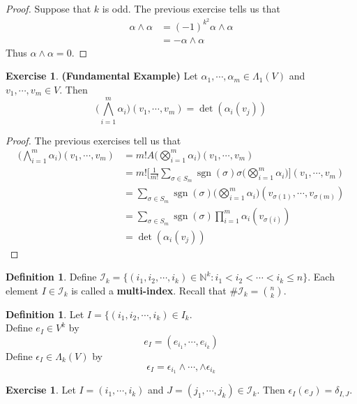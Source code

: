 \documentclass[12pt]{amsart}
\theoremstyle{definition}
\newtheorem{defn}[definition]{Definition}
\theoremstyle{remark}
\theoremstyle{definition}
\newtheorem{ex}[definition]{Exercise}
\newcommand{\al}{\alpha}
\newcommand{\del}{\delta}
\newcommand{\Lam}{\Lambda}
\newcommand{\ep}{\epsilon}
\newcommand{\sig}{\sigma}
\newcommand{\N}{\mathbb{N}}
\newcommand{\MI}{\mathcal{I}}
\DeclareMathOperator{\sgn}{sgn}
\begin{document}
	\begin{proof}
		Suppose that $k$ is odd. The previous exercise tells us that 
		\begin{align*}
			\al \wedge \al 
			&= (-1)^{k^2} \al \wedge \al \\
			&= -\al \wedge \al
		\end{align*}
		Thus $\al \wedge \al = 0$.
	\end{proof}
	
	\begin{ex}\textbf{(Fundamental Example)}
		Let $\al_1, \cdots, \al_m \in \Lam_1(V)$ and $v_1, \cdots, v_m \in V$. Then $$\bigg( \bigwedge_{i=1}^m \al_i \bigg)(v_1, \cdots, v_m) = \det (\al_i (v_j))$$
	\end{ex}

	\begin{proof}
		The previous exercises tell us that
		\begin{align*}
			\bigg( \bigwedge_{i=1}^m \al_i \bigg)(v_1, \cdots, v_m)
			&= m! A\bigg( \bigotimes_{i=1}^m \al_i \bigg) (v_1, \cdots, v_m) \\
			&= m! \bigg[ \frac{1}{m!} \sum_{\sig \in S_{m}} \sgn(\sig) \sig \bigg(\bigotimes_{i=1}^m \al_i \bigg) \bigg] (v_1, \cdots, v_m) \\
			&= \sum_{\sig \in S_{m}} \sgn(\sig)  \bigg(\bigotimes_{i=1}^m \al_i \bigg) (v_{\sig(1)}, \cdots, v_{\sig(m)}) \\
			&= \sum_{\sig \in S_{m}} \sgn(\sig)  \prod_{i=1}^m \al_i(v_{\sig(i)})   \\
			&= \det (\al_i (v_j))
		\end{align*}
	\end{proof}

	\begin{defn}
		Define $\MI_{k} = \{(i_1, i_2, \cdots, i_k) \in \N^k: i_1 < i_2 < \cdots < i_k \leq n \}$. Each element $I \in \MI_{k}$ is called a \textbf{multi-index}. Recall that $\# \MI_{k} = {n \choose k}$. 
	\end{defn}

	\begin{defn}
		Let $I = \{(i_1, i_2, \cdots, i_k) \in I_k$. \\ Define $e_I \in V^k$ by $$e_I = (e_{i_1}, \cdots, e_{i_k})$$ Define $\ep_I \in \Lam_k(V)$ by $$ \ep_I = \ep_{i_1} \wedge \cdots, \wedge \ep_{i_k} $$ 
	\end{defn}

	\begin{ex}
		Let $I = (i_1, \cdots, i_k)$ and $J = (j_1, \cdots, j_k) \in \MI_k$. Then $\ep_I(e_J) = \del_{I,J}$.
	\end{ex}
\end{document}
